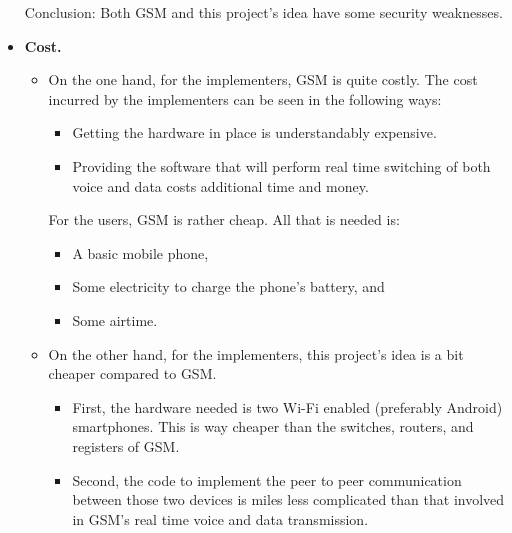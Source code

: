 \documentclass[12pt,svgnames,smaller]{article} %
\begin{document}
\begin{itemize}
\begin{itemize}
		\end{itemize}
			
		Conclusion: Both GSM and this project’s idea have some security weaknesses.
					
		
		\item \textbf{Cost.}
	
			\begin{itemize}
				
				\item On the one hand, for the implementers, GSM is quite costly. The cost incurred by the implementers can be seen in the following ways: 
				
				\begin{itemize}
					\item Getting the hardware in place is understandably expensive. 
					\item Providing the software that will perform real time switching of both voice and data costs additional time and money. 
				\end{itemize}
				
				For the users, GSM is rather cheap. All that is needed is:
				
				\begin{itemize}
					\item A basic mobile phone,
					\item Some electricity to charge the phone’s battery, and 
					\item Some airtime.
				\end{itemize}
				
				\item On the other hand, for the implementers, this project’s idea is a bit cheaper compared to GSM.
				
				\begin{itemize}
					\item First, the hardware needed is two Wi-Fi enabled (preferably Android) smartphones. This is way cheaper than the switches, routers, and registers of GSM.
					\item Second, the code to implement the peer to peer communication between those two devices is miles less complicated than that involved in GSM’s real time voice and data transmission.  
				\end{itemize}
								

\end{itemize}
\end{itemize}
\end{document}
